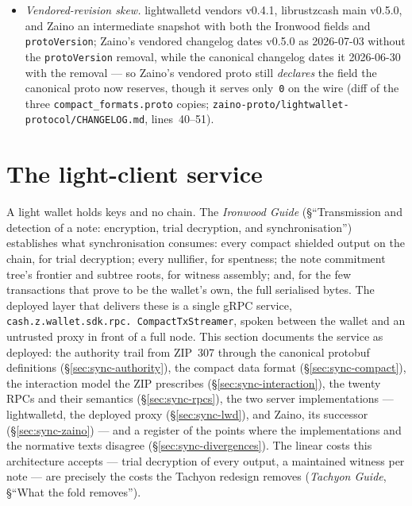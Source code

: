 \documentclass[11pt,a4paper]{article}
\theoremstyle{definition}
\begin{document}
\begin{itemize}
  says ``present if server can provide''; \textsf{lightwalletd} has a TODO,
  \textsf{Zaino} hardcodes zero (\S\ref{sec:sync-compact-wire}).
\item \emph{Vendored-revision skew.} \textsf{lightwalletd} vendors v0.4.1,
  \textsf{librustzcash} main v0.5.0, and \textsf{Zaino} an intermediate
  snapshot with both the Ironwood fields and \texttt{protoVersion};
  \textsf{Zaino}'s vendored changelog dates v0.5.0 as 2026-07-03 without
  the \texttt{protoVersion} removal, while the canonical changelog dates it
  2026-06-30 with the removal --- so \textsf{Zaino}'s vendored proto still
  \emph{declares} the field the canonical proto now reserves, though it
  serves only~\texttt{0} on the wire (diff of the three
  \texttt{compact\_formats.proto} copies;
  \texttt{zaino-proto/lightwallet-protocol/CHANGELOG.md}, lines~40--51).
\end{itemize}


\section{The light-client service}\label{sec:sync-service}

A light wallet holds keys and no chain. The \emph{Ironwood Guide}
(\S``Transmission and detection of a note: encryption, trial decryption, and
synchronisation'') establishes what synchronisation consumes: every compact
shielded output on the chain, for trial decryption; every nullifier, for
spentness; the note commitment tree's frontier and subtree roots, for
witness assembly; and, for the few transactions that prove to be the
wallet's own, the full serialised bytes. The deployed layer that delivers
these is a single gRPC service, \texttt{cash.z.wallet.sdk.rpc.\allowbreak
CompactTxStreamer}, spoken between the wallet and an untrusted proxy in
front of a full node. This section documents the service as deployed: the
authority trail from ZIP~307 through the canonical protobuf definitions
(\S\ref{sec:sync-authority}), the compact data format
(\S\ref{sec:sync-compact}), the interaction model the ZIP prescribes
(\S\ref{sec:sync-interaction}), the twenty RPCs and their semantics
(\S\ref{sec:sync-rpcs}), the two server implementations --- lightwalletd,
the deployed proxy (\S\ref{sec:sync-lwd}), and Zaino, its successor
(\S\ref{sec:sync-zaino}) --- and a register of the points where the
implementations and the normative texts disagree
(\S\ref{sec:sync-divergences}). The linear costs this architecture accepts
--- trial decryption of every output, a maintained witness per note --- are
precisely the costs the Tachyon redesign removes (\emph{Tachyon Guide},
\S``What the fold removes'').
\end{document}
